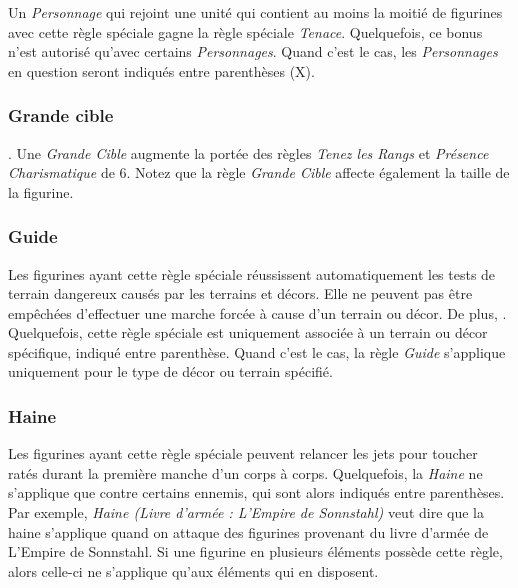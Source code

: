 \subsubsection*{}

Un \emph{Personnage} qui rejoint une unité qui contient au moins la moitié de figurines avec cette règle spéciale gagne la règle spéciale \emph{Tenace}. Quelquefois, ce bonus n'est autorisé qu'avec certains \emph{Personnages}. Quand c'est le cas, les \emph{Personnages} en question seront indiqués entre parenthèses (X).

\subsubsection*{Grande cible}

. Une \emph{Grande Cible} augmente la portée des règles \emph{Tenez les Rangs} et \emph{Présence Charismatique} de 6{\pouce}. Notez que la règle \emph{Grande Cible} affecte également la taille de la figurine.

\subsubsection*{Guide}

Les figurines ayant cette règle spéciale réussissent automatiquement les tests de terrain dangereux causés par les terrains et décors. Elle ne peuvent pas être empêchées d'effectuer une marche forcée à cause d'un terrain ou décor. De plus, . Quelquefois, cette règle spéciale est uniquement associée à un terrain ou décor spécifique, indiqué entre parenthèse. Quand c'est le cas, la règle \emph{Guide} s'applique uniquement pour le type de décor ou terrain spécifié.

\subsubsection*{Haine}

Les figurines ayant cette règle spéciale peuvent relancer les jets pour toucher ratés durant la première manche d'un corps à corps. Quelquefois, la \emph{Haine} ne s'applique que contre certains ennemis, qui sont alors indiqués entre parenthèses. Par exemple, \emph{Haine (Livre d'armée : L'Empire de Sonnstahl)} veut dire que la haine s'applique quand on attaque des figurines provenant du livre d'armée de L'Empire de Sonnstahl. Si une figurine en plusieurs éléments possède cette règle, alors celle-ci ne s'applique qu'aux éléments qui en disposent.

